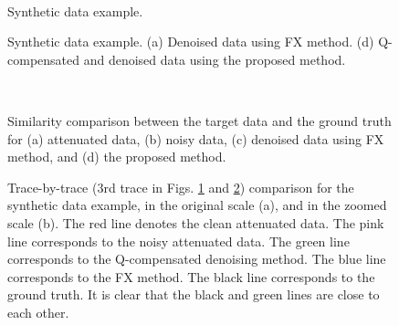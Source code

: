 \begin{figure}[htb!]
 \centering
 \\
  \caption{Synthetic data example. }
  \label{fig:syn-dc,syn-da,syn-dn}
\end{figure}

\begin{figure}[htb!]
 \centering
  \caption{Synthetic data example. (a) Denoised data using FX method. (d) Q-compensated and denoised data using the proposed method.}
  \label{fig:syn-d2,syn-d1}
\end{figure}


\begin{figure}[htb!]
 \centering
 \\
  \caption{Similarity comparison between the target data and the ground truth for (a) attenuated data, (b) noisy data, (c) denoised data using FX method, and (d) the proposed method.}
  \label{fig:syn-da-simi,syn-dn-simi,syn-d2-simi,syn-d1-simi}
\end{figure}


\begin{figure}[htb!]
 \centering
  \caption{Trace-by-trace (3rd trace in Figs. \ref{fig:syn-dc,syn-da,syn-dn} and \ref{fig:syn-d2,syn-d1}) comparison for the synthetic data example, in the original scale (a), and in the zoomed scale (b). The red line denotes the clean attenuated data. The pink line corresponds to the noisy attenuated data. The green line corresponds to the Q-compensated denoising method. The blue line corresponds to the FX method.  The black line corresponds to the ground truth. It is clear that the black and green lines are close to each other.}
  \label{fig:syn-ss0,syn-ss-z}
\end{figure}

